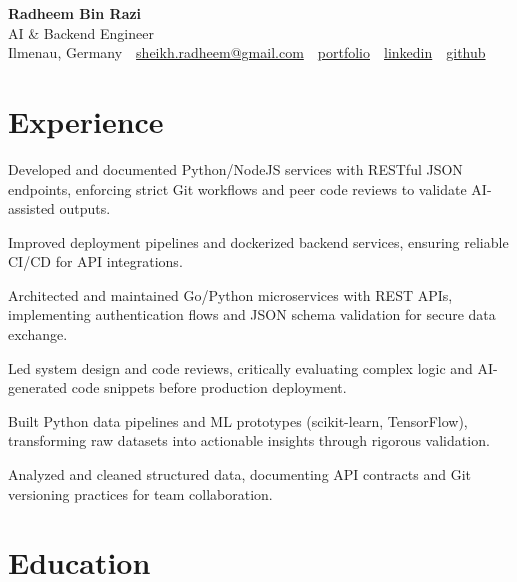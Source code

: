 \documentclass[11pt,a4paper]{resume}
\makeatletter
\newcommand{\Portfolio}{https://radheem.github.io/my-cv}
\newcommand{\PortfolioText}{portfolio}
\newcommand{\GitHub}{https://github.com/radheem}
\newcommand{\LinkedIn}{https://www.linkedin.com/in/radheem-razi}
\newcommand{\Email}{sheikh.radheem@gmail.com}
\makeatother
\begin{document}
\begin{center}
  {\huge\bfseries Radheem Bin Razi}\\[3pt]
  {\large AI \& Backend Engineer}\\[6pt]
  \small
  Ilmenau, Germany \,\textbar\,
  \href{mailto:\Email}{\Email} \,\textbar\,
  \href{\Portfolio}{\PortfolioText} \,\textbar\,
  \href{\LinkedIn}{linkedin} \,\textbar\,
  \href{\GitHub}{github}
\end{center}
\vspace{2pt}

\section{Experience}

\bullets
  \item Developed and documented Python/NodeJS services with RESTful JSON endpoints, enforcing strict Git workflows and peer code reviews to validate AI-assisted outputs.
  \item Improved deployment pipelines and dockerized backend services, ensuring reliable CI/CD for API integrations.
\bulletsend
\vspace{3pt}
\bullets
  \item Architected and maintained Go/Python microservices with REST APIs, implementing authentication flows and JSON schema validation for secure data exchange.
  \item Led system design and code reviews, critically evaluating complex logic and AI-generated code snippets before production deployment.
\bulletsend
\vspace{3pt}
\bullets
  \item Built Python data pipelines and ML prototypes (scikit-learn, TensorFlow), transforming raw datasets into actionable insights through rigorous validation.
  \item Analyzed and cleaned structured data, documenting API contracts and Git versioning practices for team collaboration.
\bulletsend
\vspace{3pt}

\section{Education}
\end{document}
